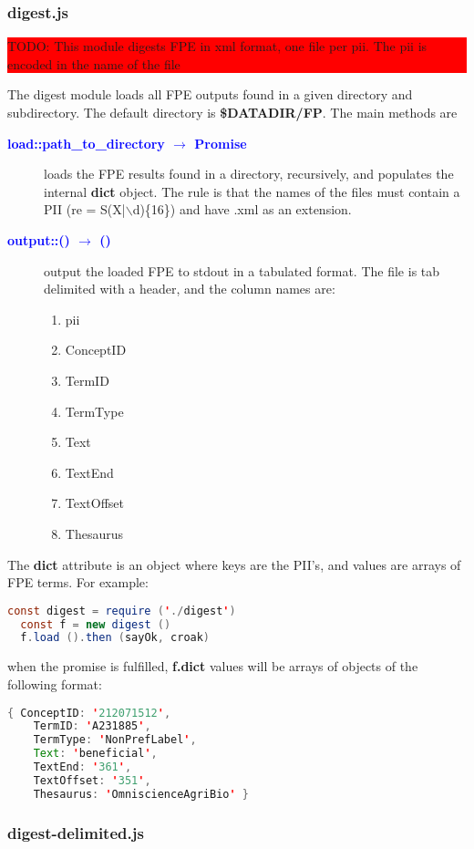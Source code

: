 \documentclass[a4paper,11pt]{report}
\newcommand{\cs}[1]{{\bfseries \ttfamily #1}}
\newcommand{\datadir}[1]{\cs{\$DATADIR/#1}}
\newcommand{\arrow}[2]{#1 $\rightarrow$ #2}
\newcommand{\fsig}[3]{\textcolor{blue}{\cs{#1::\arrow{#2}{#3}}}}
\newcommand{\sigit}[3]{\item[\fsig{#1}{#2}{#3}]}
\newcommand{\WARNING}[1]{\begin{center}\bfseries \colorbox{red}{\parbox{0.9\textwidth}{TODO: #1}}\end{center}}
\begin{document}
\subsubsection{digest.js}
\WARNING{This module digests FPE in xml format, one file per pii. The pii is encoded in the name of the file}
The digest module loads all FPE outputs found in a given directory and subdirectory.
The default directory is \datadir{FP}. The main methods are
%
\begin{description}
\sigit{load}{path\_to\_directory}{Promise} loads the FPE results found in a directory, recursively, and populates the internal \cs{dict} object. The rule is that the names of the files must contain a PII (re = S(X|$\backslash$d)\{16\}) and have .xml as an extension.
\sigit{output}{()}{()} output the loaded FPE to stdout in a tabulated format. The file is tab delimited with a header, and the column names are:
  \begin{enumerate}
  \item pii
  \item ConceptID
  \item TermID
  \item TermType
  \item Text
  \item TextEnd
  \item TextOffset
  \item Thesaurus
  \end{enumerate}
\end{description}
%
The \cs{dict} attribute is an object where keys are the PII's, and values are arrays of FPE terms. For example:
\begin{lstlisting}[language=java]
  const digest = require ('./digest')
  const f = new digest ()
  f.load ().then (sayOk, croak)
\end{lstlisting}
when the promise is fulfilled, \cs{f.dict} values will be arrays of objects of the following format:
\begin{lstlisting}[language=java]
   { ConceptID: '212071512',
    TermID: 'A231885',
    TermType: 'NonPrefLabel',
    Text: 'beneficial',
    TextEnd: '361',
    TextOffset: '351',
    Thesaurus: 'OmniscienceAgriBio' }
\end{lstlisting}
\subsubsection{digest-delimited.js}
\end{document}
